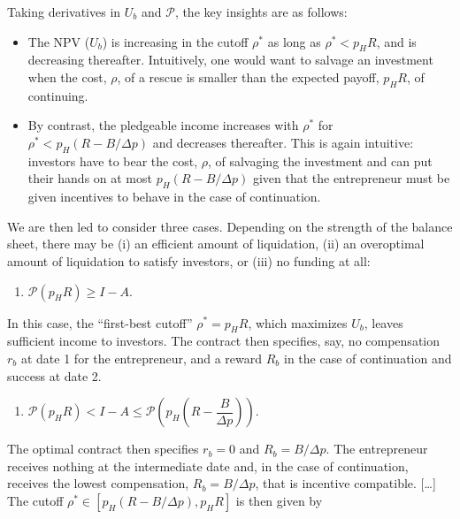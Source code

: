 \documentclass[11pt,a4paper]{article}
\providecommand{\tightlist}{\setlength{\itemsep}{0pt}\setlength{\parskip}{0pt}}
\begin{document}
Taking derivatives in \(U_b\) and \(\mathcal{P}\), the key insights are as follows:

\begin{itemize}
\tightlist
\item
  The NPV (\(U_b\)) is increasing in the cutoff \(\rho^*\) as long as \(\rho^* < p_HR\), and is
  decreasing thereafter. Intuitively, one would want to salvage an investment when the cost,
  \(\rho\), of a rescue is smaller than the expected payoff, \(p_HR\), of continuing.
\item
  By contrast, the pledgeable income increases with \(\rho^*\) for \(\rho^* < p_H(R - B/\Delta p)\)
  and decreases thereafter. This is again intuitive: investors have to bear the cost, \(\rho\), of
  salvaging the investment and can put their hands on at most \(p_H(R - B/\Delta p)\) given that the
  entrepreneur must be given incentives to behave in the case of continuation.
\end{itemize}

We are then led to consider three cases. Depending on the strength of the balance sheet, there may
be (i) an efficient amount of liquidation, (ii) an overoptimal amount of liquidation to satisfy
investors, or (iii) no funding at all:

\begin{enumerate}
\def\labelenumi{(\roman{enumi})}
\tightlist
\item
  \(\mathcal{P}(p_HR) \geqslant I - A\).
\end{enumerate}

In this case, the ``first-best cutoff'' \(\rho^* = p_HR\), which maximizes \(U_b\), leaves
sufficient income to investors. The contract then specifies, say, no compensation \(r_b\) at date 1
for the entrepreneur, and a reward \(R_b\) in the case of continuation and success at date 2.

\begin{enumerate}
\def\labelenumi{(\roman{enumi})}
\setcounter{enumi}{1}
\tightlist
\item
  \(\mathcal{P}(p_HR) < I - A \leqslant \mathcal{P}\left(p_H\left(R - \dfrac{B}{\Delta p}\right)\right)\).
\end{enumerate}

The optimal contract then specifies \(r_b = 0\) and \(R_b = B/\Delta p\). The entrepreneur receives
nothing at the intermediate date and, in the case of continuation, receives the lowest compensation,
\(R_b = B/\Delta p\), that is incentive compatible. {[}\ldots{]} The cutoff
\(\rho^* \in [p_H(R - B/\Delta p), p_HR]\) is then given by
\end{document}
